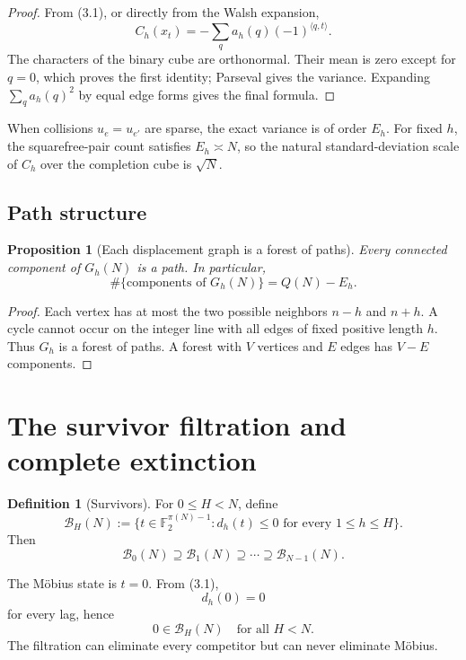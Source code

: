 \documentclass[11pt]{article}
\newtheorem{proposition}[theorem]{Proposition}
\theoremstyle{definition}
\newtheorem{definition}[theorem]{Definition}
\theoremstyle{remark}
\newcommand{\Ftwo}{\mathbb F_2}
\newcommand{\BH}{\mathcal B}
\begin{document}
\begin{proof}
From (3.1), or directly from the Walsh expansion,
\[
 C_h(x_t)=-\sum_q a_h(q)(-1)^{\langle q,t\rangle}.
\]
The characters of the binary cube are orthonormal.  Their mean is zero except for $q=0$, which proves the first identity; Parseval gives the variance.  Expanding $\sum_q a_h(q)^2$ by equal edge forms gives the final formula.
\end{proof}

When collisions $u_e=u_{e'}$ are sparse, the exact variance is of order $E_h$.  For fixed $h$, the squarefree-pair count satisfies $E_h\asymp N$, so the natural standard-deviation scale of $C_h$ over the completion cube is $\sqrt N$.

\subsection{Path structure}

\begin{proposition}[Each displacement graph is a forest of paths]\label{prop:paths}
Every connected component of $G_h(N)$ is a path.  In particular,
\[
 \boxed{
 \#\{\text{components of }G_h(N)\}=Q(N)-E_h.
 }
\]
\end{proposition}

\begin{proof}
Each vertex has at most the two possible neighbors $n-h$ and $n+h$.  A cycle cannot occur on the integer line with all edges of fixed positive length $h$.  Thus $G_h$ is a forest of paths.  A forest with $V$ vertices and $E$ edges has $V-E$ components.
\end{proof}

\section{The survivor filtration and complete extinction}

\begin{definition}[Survivors]
For $0\le H<N$, define
\[
 \boxed{
 \BH_H(N):=
 \{t\in\Ftwo^{\pi(N)-1}:d_h(t)\le0\text{ for every }1\le h\le H\}.
 }
\]
Then
\[
 \BH_0(N)\supseteq\BH_1(N)\supseteq\cdots\supseteq\BH_{N-1}(N).
\]
\end{definition}

The M\"obius state is $t=0$.  From (3.1),
\[
 d_h(0)=0
\]
for every lag, hence
\[
 \boxed{0\in\BH_H(N)\quad\text{for all }H<N.}
\]
The filtration can eliminate every competitor but can never eliminate M\"obius.
\end{document}
